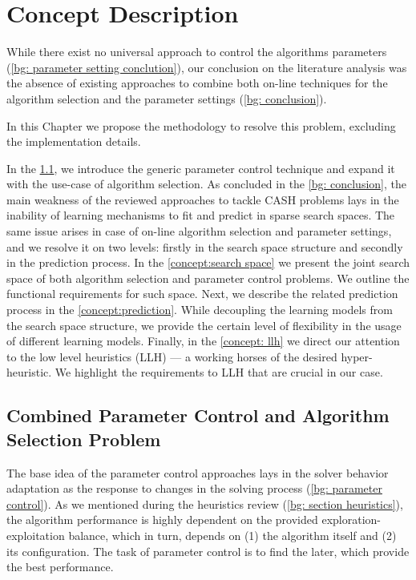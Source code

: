 \chapter{Concept Description}\label{Concept description}
While there exist no universal approach to control the algorithms parameters (\cref{bg: parameter setting conclution}), our conclusion on the literature analysis was the absence of existing approaches to combine both on-line techniques for the algorithm selection and the parameter settings (\cref{bg: conclusion}). 

In this Chapter we propose the methodology to resolve this problem, excluding the implementation details.

In the \cref{concept:parameter control}, we introduce the generic parameter control technique and expand it with the use-case of algorithm selection. As concluded in the \cref{bg: conclusion}, the main weakness of the reviewed approaches to tackle CASH problems lays in the inability of learning mechanisms to fit and predict in sparse search spaces. The same issue arises in case of on-line algorithm selection and parameter settings, and we resolve it on two levels: firstly in the search space structure and secondly in the prediction process. In the \cref{concept:search space} we present the joint search space of both algorithm selection and parameter control problems. We outline the functional requirements for such space. Next, we describe the related prediction process in the \cref{concept:prediction}. While decoupling the learning models from the search space structure, we provide the certain level of flexibility in the usage of different learning models.
Finally, in the \cref{concept: llh} we direct our attention to the low level heuristics (LLH) — a working horses of the desired hyper-heuristic. We highlight the requirements to LLH that are crucial in our case.


\section{Combined Parameter Control and Algorithm Selection Problem}\label{concept:parameter control}
The base idea of the parameter control approaches lays in the solver behavior adaptation as the response to changes in the solving process (\cref{bg: parameter control}). As we mentioned during the heuristics review (\cref{bg: section heuristics}), the algorithm performance is highly dependent on the provided exploration-exploitation balance, which in turn, depends on (1) the algorithm itself and (2) its configuration. The task of parameter control is to find the later, which provide the best performance.

